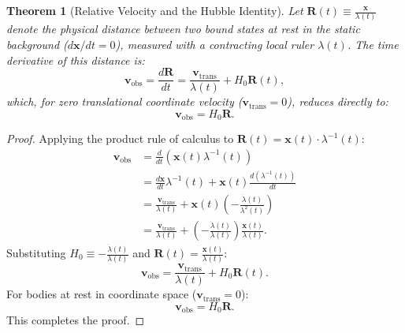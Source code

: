 \documentclass[11pt,a4paper]{article}
\newtheorem{theorem}{Theorem}[section]
\begin{document}
\begin{theorem}[Relative Velocity and the Hubble Identity]
    \label{thm:hubble_teoremi}
    Let $\mathbf{R}(t) \equiv \frac{\mathbf{x}}{\lambda(t)}$ denote the physical distance between two bound states at rest in the static background ($d\mathbf{x}/dt = 0$), measured with a contracting local ruler $\lambda(t)$. The time derivative of this distance is:
    \begin{equation}
        \mathbf{v}_{\mathrm{obs}} = \frac{d\mathbf{R}}{dt} = \frac{\mathbf{v}_{\mathrm{trans}}}{\lambda(t)} + H_0 \mathbf{R}(t),
        \label{eq:hubble_ispat}
    \end{equation}
    which, for zero translational coordinate velocity ($\mathbf{v}_{\mathrm{trans}} = 0$), reduces directly to:
    \begin{equation}
        \mathbf{v}_{\mathrm{obs}} = H_0 \mathbf{R}.
        \label{eq:hubble_saf}
    \end{equation}
\end{theorem}

\begin{proof}
    Applying the product rule of calculus to $\mathbf{R}(t) = \mathbf{x}(t) \cdot \lambda^{-1}(t)$:
    \begin{align*}
        \mathbf{v}_{\mathrm{obs}} & = \frac{d}{dt} \left( \mathbf{x}(t) \lambda^{-1}(t) \right)                                                                            \\
                                  & = \frac{d\mathbf{x}}{dt} \lambda^{-1}(t) + \mathbf{x}(t) \frac{d(\lambda^{-1}(t))}{dt}                                                 \\
                                  & = \frac{\mathbf{v}_{\mathrm{trans}}}{\lambda(t)} + \mathbf{x}(t) \left( -\frac{\dot{\lambda}(t)}{\lambda^2(t)} \right)                 \\
                                  & = \frac{\mathbf{v}_{\mathrm{trans}}}{\lambda(t)} + \left(-\frac{\dot{\lambda}(t)}{\lambda(t)}\right) \frac{\mathbf{x}(t)}{\lambda(t)}.
    \end{align*}
    Substituting $H_0 \equiv -\frac{\dot{\lambda}(t)}{\lambda(t)}$ and $\mathbf{R}(t) = \frac{\mathbf{x}(t)}{\lambda(t)}$:
    $$\mathbf{v}_{\mathrm{obs}} = \frac{\mathbf{v}_{\mathrm{trans}}}{\lambda(t)} + H_0 \mathbf{R}(t).$$
    For bodies at rest in coordinate space ($\mathbf{v}_{\mathrm{trans}} = 0$):
    $$\mathbf{v}_{\mathrm{obs}} = H_0 \mathbf{R}.$$
    This completes the proof.
\end{proof}
\end{document}
